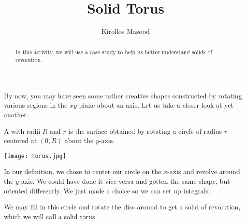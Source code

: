 \documentclass{ximera}
\title{Solid Torus}
\author{Kirollos Masood}
\begin{document}
\begin{abstract}
In this activity, we will use a case study to help us better understand solids of revolution.
\end{abstract}
\maketitle

By now, you may have seen some rather creative shapes constructed by rotating various regions in the $xy$-plane about an axis. Let us take a closer look at yet another.
\begin{definition}
	A  with radii $R$ and $r$ is the surface obtained by rotating a circle of radius $r$ centered at $(0,R)$ about the $y$-axis.
\end{definition}

\begin{image}
	\label{torus}
	\texttt{[image: torus.jpg]}
\end{image}

\begin{onlineOnly}
\begin{center}
\end{center}
\end{onlineOnly}

\begin{remark}
	In our definition, we chose to center our circle on the $x$-axis and revolve around the $y$-axis. We could have done it vice versa and gotten the same shape, but oriented differently. We just made a choice so we can set up integrals.
\end{remark} 

We may fill in this circle and rotate the disc around to get a solid of revolution, which we will call a solid torus.
\end{document}
